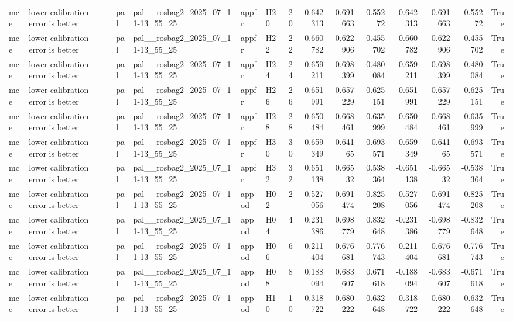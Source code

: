 \begin{longtable}{llllllrrrrrrrr}
mce & lower calibration error is better & pal & pal\_\_rosbag2\_2025\_07\_11-13\_55\_25 & appfr & H20 & 20 & 0.642313 & 0.691663 & 0.55272 & -0.642313 & -0.691663 & -0.55272 & True \\
mce & lower calibration error is better & pal & pal\_\_rosbag2\_2025\_07\_11-13\_55\_25 & appfr & H22 & 22 & 0.660782 & 0.622906 & 0.455702 & -0.660782 & -0.622906 & -0.455702 & True \\
mce & lower calibration error is better & pal & pal\_\_rosbag2\_2025\_07\_11-13\_55\_25 & appfr & H24 & 24 & 0.659211 & 0.698399 & 0.480084 & -0.659211 & -0.698399 & -0.480084 & True \\
mce & lower calibration error is better & pal & pal\_\_rosbag2\_2025\_07\_11-13\_55\_25 & appfr & H26 & 26 & 0.651991 & 0.657229 & 0.625151 & -0.651991 & -0.657229 & -0.625151 & True \\
mce & lower calibration error is better & pal & pal\_\_rosbag2\_2025\_07\_11-13\_55\_25 & appfr & H28 & 28 & 0.650484 & 0.668461 & 0.635999 & -0.650484 & -0.668461 & -0.635999 & True \\
mce & lower calibration error is better & pal & pal\_\_rosbag2\_2025\_07\_11-13\_55\_25 & appfr & H30 & 30 & 0.659349 & 0.64165 & 0.693571 & -0.659349 & -0.64165 & -0.693571 & True \\
mce & lower calibration error is better & pal & pal\_\_rosbag2\_2025\_07\_11-13\_55\_25 & appfr & H32 & 32 & 0.651138 & 0.66532 & 0.538364 & -0.651138 & -0.66532 & -0.538364 & True \\
mce & lower calibration error is better & pal & pal\_\_rosbag2\_2025\_07\_11-13\_55\_25 & appod & H02 & 2 & 0.527056 & 0.691474 & 0.825208 & -0.527056 & -0.691474 & -0.825208 & True \\
mce & lower calibration error is better & pal & pal\_\_rosbag2\_2025\_07\_11-13\_55\_25 & appod & H04 & 4 & 0.231386 & 0.698779 & 0.832648 & -0.231386 & -0.698779 & -0.832648 & True \\
mce & lower calibration error is better & pal & pal\_\_rosbag2\_2025\_07\_11-13\_55\_25 & appod & H06 & 6 & 0.211404 & 0.676681 & 0.776743 & -0.211404 & -0.676681 & -0.776743 & True \\
mce & lower calibration error is better & pal & pal\_\_rosbag2\_2025\_07\_11-13\_55\_25 & appod & H08 & 8 & 0.188094 & 0.683607 & 0.671618 & -0.188094 & -0.683607 & -0.671618 & True \\
mce & lower calibration error is better & pal & pal\_\_rosbag2\_2025\_07\_11-13\_55\_25 & appod & H10 & 10 & 0.318722 & 0.680222 & 0.632648 & -0.318722 & -0.680222 & -0.632648 & True \\

\end{longtable}

